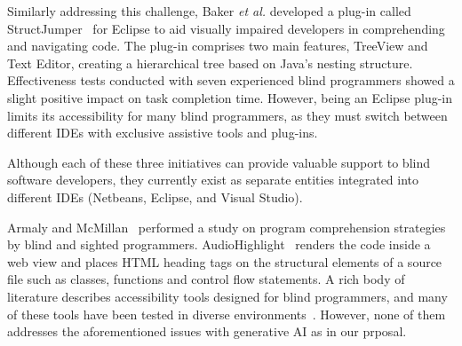 Similarly addressing this challenge, Baker {\em et al.} developed a
plug-in called StructJumper~\cite{BakerML15} for Eclipse to aid
visually impaired developers in comprehending and navigating code. The
plug-in comprises two main features, TreeView and Text Editor,
creating a hierarchical tree based on Java's nesting
structure. Effectiveness tests conducted with seven experienced blind
programmers showed a slight positive impact on task completion time.
However, being an Eclipse plug-in limits its accessibility for many blind programmers, as they must switch between different IDEs with exclusive assistive tools and plug-ins.

Although each of these three initiatives can provide valuable support
to blind software developers, they currently exist as separate
entities integrated into different IDEs (Netbeans, Eclipse, and Visual
Studio).

Armaly and McMillan~\cite{armaly-tse18} performed a study on program
comprehension strategies by blind and sighted
programmers. AudioHighlight~\cite{armaly-icsme18} renders the code
inside a web view and places HTML heading tags on the structural
elements of a source file such as classes, functions and control flow
statements. A rich body of literature describes accessibility tools
designed for blind programmers, and many of these tools have been
tested in diverse
environments~\cite{10.1145/2897586.2897616,10.1145/1056808.1057018,10.1145/800071.802260,10.1006/jnca.1998.0060,10.1145/2501988.2502047,10.1145/568600.568611,10.1145/3308561.3354616,10.1145/1168987.1169035,10.1145/1408760.1408761,10.1145/238386.238405,10.5555/1103141.1103147,10.1145/1953163.1953323,5306335,10.1145/1121341.1121427,10.1145/2889160.2889188,10.1145/2889160.2891041,10.1145/3132525.3132550,10.1145/3170427.3188696,10.1145/2661334.2661385,6344485,10.1145/292834.292839,10.1145/563517.563372,10.1145/2556288.2557073,5967168,10.1145/1029014.1028654,10.1145/354324.354356,4268242,10.1016/j.ijhcs.2011.07.002,10.1145/1953163.1953323,10.1145/2982142.2982168,casten2005knowledge,CHIANG2005394,crossland2014smartphone,10.1145/1357054.1357250,gill2013digital,horowitz2003influence,10.1145/274497.274512,10.1145/354324.354327,janiszewski2006low,10.1145/1639642.1639663,margrain2000helping,massof2002model,massof2002model,scott2002impact,theofanos2005helping,watson1997national}. However,
none of them addresses the aforementioned issues with generative AI as
in our prposal.

